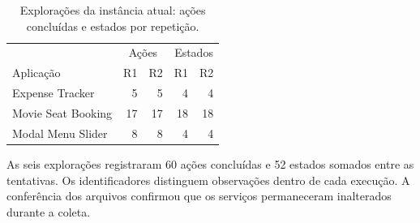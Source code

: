 \begin{table}[ht]
\centering
\caption{Explorações da instância atual: ações concluídas e estados por repetição.}
\label{tab:current}
\small
\begin{tabular}{lrrrr}
\toprule
 & \multicolumn{2}{c}{Ações} & \multicolumn{2}{c}{Estados}\\
Aplicação & R1 & R2 & R1 & R2\\
\midrule
Expense Tracker & 5 & 5 & 4 & 4\\
Movie Seat Booking & 17 & 17 & 18 & 18\\
Modal Menu Slider & 8 & 8 & 4 & 4\\
\bottomrule
\end{tabular}
\end{table}
As seis explorações registraram 60 ações concluídas e 52 estados somados entre as tentativas. Os identificadores distinguem observações dentro de cada execução. A conferência dos arquivos confirmou que os serviços permaneceram inalterados durante a coleta.
